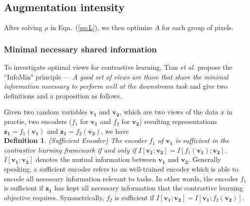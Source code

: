 \documentclass[10pt,twocolumn,letterpaper]{article}
\begin{document}



\subsection{Augmentation intensity} \label{sec:info_view}

After solving $\rho$ in Eqn.~(\ref{eq:L}), we then optimize $A$ for each group of pixels. 

\subsubsection{Minimal necessary 
shared information} \label{sec:aug_int}

To investigate optimal views for contrastive learning, Tian {\it et al.} \cite{tian2020makes} propose the ``InfoMin" principle --- {\it A good set of views are those that share the {minimal information necessary} to perform well at the downstream task} and give two definitions and a proposition as follows.

Given two random variables $\mathbf{v_1}$ and $\mathbf{v_2}$, which are two views of the data $x$ in practie, two encoders ($f_1$ for $\mathbf{v_1}$ and $f_2$ for $\mathbf{v_2}$) resulting representations $\mathbf{z_1} = f_1(\mathbf{v_1})$ and $\mathbf{z_1} = f_2(\mathbf{v_2})$, we have\\ 
{\bf Definition 1}. {\it (Sufficient Encoder) The encoder $f_1$ of $\mathbf{v_1}$ is sufficient in the contrastive learning framework if and only if $I[\mathbf{v_1};\mathbf{v_2}]=I[f_1(\mathbf{v_1}); \mathbf{v_2}]$.} $I[\mathbf{v_1};\mathbf{v_2}]$ denotes the mutual information between $\mathbf{v_1}$ and $\mathbf{v_2}$. Generally speaking, a sufficient encoder refers to an well-trained encoder which is able to encode all necessary information relevant to tasks. In other words, the encoder $f_1$ is sufficient if $\mathbf{z_1}$ has kept all necessary information that the contrastive learning objective requires. Symmetrically, $f_2$ is sufficient if $I[\mathbf{v_1}; \mathbf{v_2}] = I[\mathbf{v_1}; f_2(\mathbf{v_2})]$.
\end{document}
